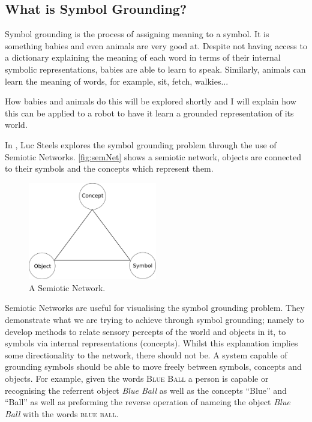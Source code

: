 \subsection{What is Symbol Grounding?}
Symbol grounding is the process of assigning meaning to a symbol. It is something babies and even animals are very good at. Despite not having access to a dictionary explaining the meaning of each word in terms of their internal symbolic representations, babies are able to learn to speak. Similarly, animals can learn the meaning of words, for example, sit, fetch, walkies...

How babies and animals do this will be explored shortly and I will explain how this can be applied to a robot to have it learn a grounded representation of its world.

In \cite{steels2008symbol}, Luc Steels explores the symbol grounding problem through the use of Semiotic Networks. \autoref{fig:semNet} shows a semiotic network, objects are connected to their symbols and the concepts which represent them.

\begin{figure}
\centering
\includegraphics[width=0.5\textwidth]{Figs/litReview/semioticNet.png}
\caption{A Semiotic Network.}
\label{fig:semNet}

\end{figure} 

Semiotic Networks are useful for visualising the symbol grounding problem. They demonstrate what we are trying to achieve through symbol grounding; namely to develop methods to relate sensory percepts of the world and objects in it, to symbols via internal representations (concepts). Whilst this explanation implies some directionality to the network, there should not be. A system capable of grounding symbols should be able to move freely between symbols, concepts and objects. For example, given the words \textsc{Blue Ball} a person is capable or recognising the referrent object  \textit{Blue Ball} as well as the concepts ``Blue'' and ``Ball'' as well as preforming the reverse operation of nameing the object \textit{Blue Ball} with the words \textsc{blue ball}.


